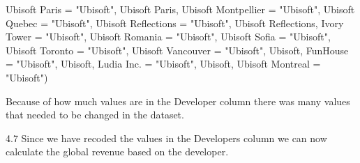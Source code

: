 \documentclass[
]{article}
\newenvironment{Shaded}{\begin{snugshade}}{\end{snugshade}}
\newcommand{\AttributeTok}[1]{\textcolor[rgb]{0.77,0.63,0.00}{#1}}
\newcommand{\NormalTok}[1]{#1}
\newcommand{\OtherTok}[1]{\textcolor[rgb]{0.56,0.35,0.01}{#1}}
\newcommand{\StringTok}[1]{\textcolor[rgb]{0.31,0.60,0.02}{#1}}
\begin{document}
\begin{Shaded}
\begin{Highlighting}[]
    \StringTok{\textasciigrave{}}\AttributeTok{Ubisoft Paris}\StringTok{\textasciigrave{}} \OtherTok{=} \StringTok{"Ubisoft"}\NormalTok{, }\StringTok{\textasciigrave{}}\AttributeTok{Ubisoft Paris, Ubisoft Montpellier}\StringTok{\textasciigrave{}} \OtherTok{=} \StringTok{"Ubisoft"}\NormalTok{,}
    \StringTok{\textasciigrave{}}\AttributeTok{Ubisoft Quebec}\StringTok{\textasciigrave{}} \OtherTok{=} \StringTok{"Ubisoft"}\NormalTok{, }\StringTok{\textasciigrave{}}\AttributeTok{Ubisoft Reflections}\StringTok{\textasciigrave{}} \OtherTok{=} \StringTok{"Ubisoft"}\NormalTok{, }\StringTok{\textasciigrave{}}\AttributeTok{Ubisoft Reflections, Ivory Tower}\StringTok{\textasciigrave{}} \OtherTok{=} \StringTok{"Ubisoft"}\NormalTok{,}
    \StringTok{\textasciigrave{}}\AttributeTok{Ubisoft Romania}\StringTok{\textasciigrave{}} \OtherTok{=} \StringTok{"Ubisoft"}\NormalTok{, }\StringTok{\textasciigrave{}}\AttributeTok{Ubisoft Sofia}\StringTok{\textasciigrave{}} \OtherTok{=} \StringTok{"Ubisoft"}\NormalTok{, }\StringTok{\textasciigrave{}}\AttributeTok{Ubisoft Toronto}\StringTok{\textasciigrave{}} \OtherTok{=} \StringTok{"Ubisoft"}\NormalTok{,}
    \StringTok{\textasciigrave{}}\AttributeTok{Ubisoft Vancouver}\StringTok{\textasciigrave{}} \OtherTok{=} \StringTok{"Ubisoft"}\NormalTok{, }\StringTok{\textasciigrave{}}\AttributeTok{Ubisoft, FunHouse}\StringTok{\textasciigrave{}} \OtherTok{=} \StringTok{"Ubisoft"}\NormalTok{, }\StringTok{\textasciigrave{}}\AttributeTok{Ubisoft, Ludia Inc.}\StringTok{\textasciigrave{}} \OtherTok{=} \StringTok{"Ubisoft"}\NormalTok{,}
    \StringTok{\textasciigrave{}}\AttributeTok{Ubisoft, Ubisoft Montreal}\StringTok{\textasciigrave{}} \OtherTok{=} \StringTok{"Ubisoft"}\NormalTok{)}
\end{Highlighting}
\end{Shaded}

Because of how much values are in the Developer column there was many
values that needed to be changed in the dataset.

4.7 Since we have recoded the values in the Developers column we can now
calculate the global revenue based on the developer.
\end{document}
